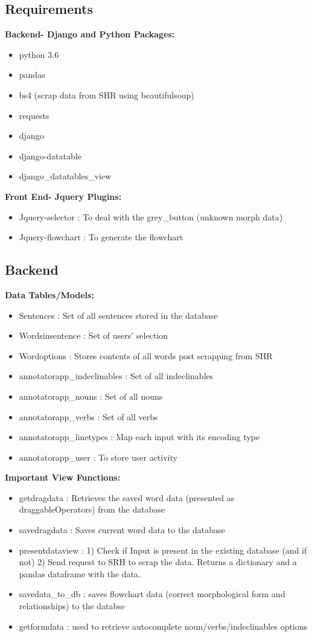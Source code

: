 \documentclass[12pt]{article}
\begin{document}
\subsection{Requirements}
\textbf{Backend- Django and Python Packages:}
\begin{itemize}
	\item python 3.6
	\item pandas
	\item bs4 (scrap data from SHR using beautifulsoup)
	\item requests
	\item django
	\item django-datatable
	\item django\_datatables\_view
\end{itemize}
\textbf{Front End- Jquery Plugins:}
\begin{itemize}
	\item Jquery-selector : To deal with the grey\_button (unknown morph data)
	\item Jquery-flowchart : To generate the flowchart
\end{itemize}

\subsection{Backend}

\textbf{Data Tables/Models:}
\begin{itemize}
	\item Sentences : Set of all sentences stored in the database
	\item Wordsinsentence : Set of users' selection
	\item Wordoptions : Stores contents of all words post scrapping from SHR
	\item annotatorapp\_indeclinables : Set of all indeclinables
	\item annotatorapp\_nouns : Set of all nouns
	\item annotatorapp\_verbs : Set of all verbs
	\item annotatorapp\_linetypes : Map each input with its encoding type
	\item annotatorapp\_user : To store user activity 
\end{itemize}

\textbf{Important View Functions:}
\begin{itemize}
	\item  getdragdata : Retrieves the saved word data (presented as draggableOperators) from the database
	\item  savedragdata : Saves current word data to the database
	\item  presentdataview : 1) Check if Input is present in the existing database (and if not) 2) Send request to SRH to scrap the data. Returns a dictionary and a pandas dataframe with the data.
	\item  savedata\_to\_db : saves flowchart data (correct morphological form and relationships) to the databse
	\item  getformdata : used to retrieve autocomplete noun/verbs/indeclinables options
\end{itemize}
\end{document}
